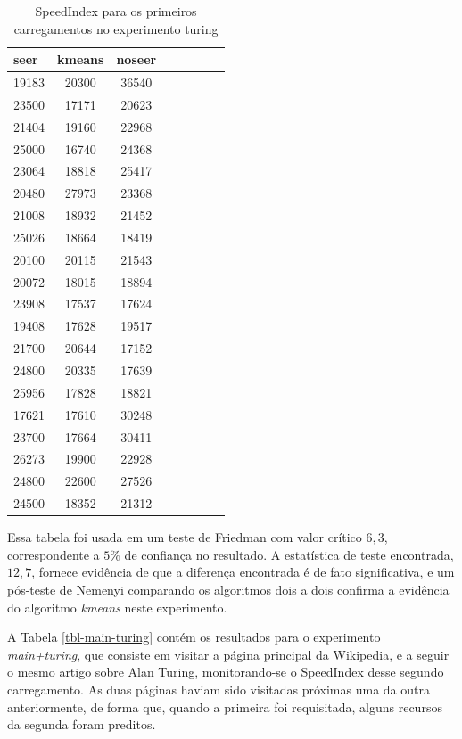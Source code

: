 \documentclass[10pt,twocolumn,letterpaper]{article}
\begin{document}
\begin{table}
\begin{center}
\begin{tabular}{l*{6}{c}r}
\hline
seer & kmeans & noseer \\
\hline
19183 & 20300 & 36540 \\
23500 & 17171 & 20623 \\
21404 & 19160 & 22968 \\
25000 & 16740 & 24368 \\
23064 & 18818 & 25417 \\
20480 & 27973 & 23368 \\
21008 & 18932 & 21452 \\
25026 & 18664 & 18419 \\
20100 & 20115 & 21543 \\
20072 & 18015 & 18894 \\
23908 & 17537 & 17624 \\
19408 & 17628 & 19517 \\
21700 & 20644 & 17152 \\
24800 & 20335 & 17639 \\
25956 & 17828 & 18821 \\
17621 & 17610 & 30248 \\
23700 & 17664 & 30411 \\
26273 & 19900 & 22928 \\
24800 & 22600 & 27526 \\
24500 & 18352 & 21312 \\
\end{tabular}
\end{center}
\caption{SpeedIndex para os primeiros carregamentos no experimento turing}
\label{tbl-turing-fvs}
\end{table}

Essa tabela foi usada em um teste de Friedman com valor crítico $6,3$, correspondente a $5 \%$ de confiança no resultado. A estatística de teste encontrada, $12,7$, fornece evidência de que a diferença encontrada é de fato significativa, e um pós-teste de Nemenyi comparando os algoritmos dois a dois confirma a evidência do algoritmo \emph{kmeans} neste experimento.

A Tabela \ref{tbl-main-turing} contém os resultados para o experimento \emph{main+turing}, que consiste em visitar a página principal da Wikipedia, e a seguir o mesmo artigo sobre Alan Turing, monitorando-se o SpeedIndex desse segundo carregamento. As duas páginas haviam sido visitadas próximas uma da outra anteriormente, de forma que, quando a primeira foi requisitada, alguns recursos da segunda foram preditos.
\end{document}

